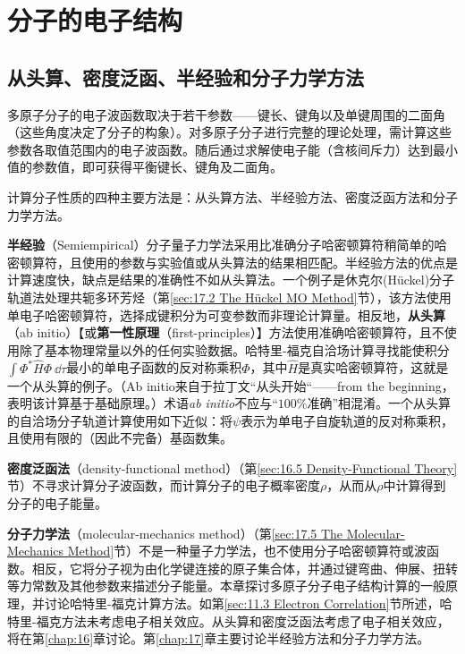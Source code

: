 \chapter{分子的电子结构}
\label{chap:15}
\section{从头算、密度泛函、半经验和分子力学方法}
\label{sec:15.1 Ab Initio, Density-Functional, Semiempirical and Molecular-Mechanics Methods}

    多原子分子的电子波函数取决于若干参数——键长、键角以及单键周围的二面角（这些角度决定了分子的构象）。对多原子分子进行完整的理论处理，需计算这些参数各取值范围内的电子波函数。随后通过求解使电子能（含核间斥力）达到最小值的参数值，即可获得平衡键长、键角及二面角。

    计算分子性质的四种主要方法是：从头算方法、半经验方法、密度泛函方法和分子力学方法。

    \textbf{半经验}（Semiempirical）分子量子力学法采用比准确分子哈密顿算符稍简单的哈密顿算符，且使用的参数与实验值或从头算法的结果相匹配。半经验方法的优点是计算速度快，缺点是结果的准确性不如从头算法。一个例子是休克尔(Hückel)分子轨道法处理共轭多环芳烃（第\ref{sec:17.2 The Hückel MO Method}节），该方法使用单电子哈密顿算符，选择成键积分为可变参数而非理论计算量。相反地，\textbf{从头算}（ab initio）【或\textbf{第一性原理}（first-principles）】方法使用准确哈密顿算符，且不使用除了基本物理常量以外的任何实验数据。哈特里-福克自洽场计算寻找能使积分$\int \Phi^* \hat{H} \Phi \:\dd\tau$最小的单电子函数的反对称乘积$\Phi$，其中$\hat{H}$是真实哈密顿算符，这就是一个从头算的例子。（Ab initio来自于拉丁文“从头开始“——from the beginning，表明该计算基于基础原理。）术语\textit{ab initio}不应与“$100\%$准确”相混淆。一个从头算的自洽场分子轨道计算使用如下近似：将$\psi$表示为单电子自旋轨道的反对称乘积，且使用有限的（因此不完备）基函数集。

    \textbf{密度泛函法}（density-functional method）（第\ref{sec:16.5 Density-Functional Theory}节）不寻求计算分子波函数，而计算分子的电子概率密度$\rho$，从而从$\rho$中计算得到分子的电子能量。

    \textbf{分子力学法}（molecular-mechanics method）（第\ref{sec:17.5 The Molecular-Mechanics Method}节）不是一种量子力学法，也不使用分子哈密顿算符或波函数。相反，它将分子视为由化学键连接的原子集合体，并通过键弯曲、伸展、扭转等力常数及其他参数来描述分子能量。本章探讨多原子分子电子结构计算的一般原理，并讨论哈特里-福克计算方法。如第\ref{sec:11.3 Electron Correlation}节所述，哈特里-福克方法未考虑电子相关效应。从头算和密度泛函法考虑了电子相关效应，将在第\ref{chap:16}章讨论。第\ref{chap:17}章主要讨论半经验方法和分子力学方法。

